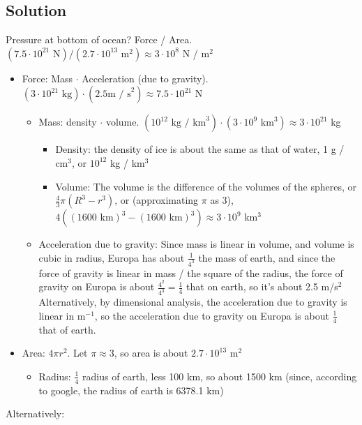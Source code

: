 \documentclass[solutions]{esg8012pset}
\begin{document}
\subsection*{Solution}
  Pressure at bottom of ocean?  Force / Area.  $(7.5\cdot 10^{21}\text{ N}) / (2.7 \cdot 10^{13}\text{ m}^2) \approx 3 \cdot 10^8$ N / m$^2$
  \begin{itemize}
    \item Force: Mass $\cdot$ Acceleration (due to gravity). $(3 \cdot 10^{21}\text{ kg}) \cdot (2.5\text{m / s}^2) \approx 7.5\cdot 10^{21}$ N
      \begin{itemize}
        \item Mass: density $\cdot$ volume.  $(10^{12}\text{ kg / km}^3) \cdot (3 \cdot 10^9\text{ km}^3) \approx 3 \cdot 10^{21}$ kg
          \begin{itemize}
            \item Density: the density of ice is about the same as that of water, 1 g / cm$^3$, or $10^{12}$ kg / km$^3$
            \item Volume: The volume is the difference of the volumes of the spheres, or $\frac{4}{3}\pi (R^3 - r^3)$, or (approximating $\pi$ as 3), $4((1600\text{ km})^3 - (1600\text{ km})^3) \approx 3 \cdot 10^9$ km$^3$
          \end{itemize}
        \item Acceleration due to gravity: Since mass is linear in volume, and volume is cubic in radius, Europa has about $\frac{1}{4^3}$ the mass of earth, and since the force of gravity is linear in mass / the square of the radius, the force of gravity on Europa is about $\frac{4^2}{4^3} = \frac{1}{4}$ that on earth, so it's about 2.5 m/s$^2$  Alternatively, by dimensional analysis, the acceleration due to gravity is linear in m$^{-1}$, so the acceleration due to gravity on Europa is about $\frac{1}{4}$ that of earth.
      \end{itemize}
    \item Area: $4\pi r^2$.  Let $\pi \approx 3$, so area is about $2.7 \cdot 10^{13}$ m$^2$
      \begin{itemize}
        \item Radius: $\frac{1}{4}$ radius of earth, less 100 km, so about 1500 km (since, according to google, the radius of earth is 6378.1 km)
      \end{itemize}
  \end{itemize}
  \vspace{2em}
  \noindent Alternatively: \par
\end{document}
